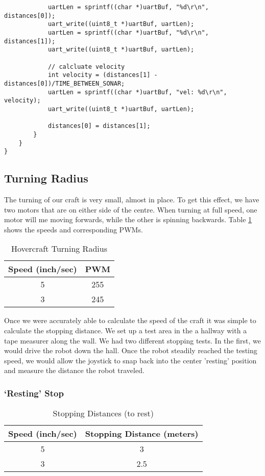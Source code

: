 \begin{lstlisting}
            uartLen = sprintf((char *)uartBuf, "%d\r\n", distances[0]);
            uart_write((uint8_t *)uartBuf, uartLen);
            uartLen = sprintf((char *)uartBuf, "%d\r\n", distances[1]);
            uart_write((uint8_t *)uartBuf, uartLen);

            // calcluate velocity
            int velocity = (distances[1] - distances[0])/TIME_BETWEEN_SONAR;
            uartLen = sprintf((char *)uartBuf, "vel: %d\r\n", velocity);
            uart_write((uint8_t *)uartBuf, uartLen);

            distances[0] = distances[1];
        }
    }
}
\end{lstlisting}

\subsection{Turning Radius}
The turning of our craft is very small, almost in place. To get this effect, we have two motors that are on either side of the centre. When turning at full speed, one motor will me moving forwards, while the other is spinning backwards. Table \ref{turningRadius} shows the speeds and corresponding PWMs. 

\begin{table}
\caption{Hovercraft Turning Radius}
\begin{center}
\begin{tabular}{ c c }
  Speed (inch/sec) & PWM \\
  \hline
  5 & 255 \\
  3 & 245 \\
\end{tabular}
\end{center}
\label{turningRadius}
\end{table}

Once we were accurately able to calculate the speed of the craft it was simple to calculate the stopping distance. We set up a test area in the a hallway with a tape measurer along the wall. We had two different stopping tests. In the first, we would drive the robot down the hall. Once the robot steadily reached the testing speed, we would allow the joystick to snap back into the center 'resting' position and measure the distance the robot traveled.

\subsubsection{`Resting' Stop}
\begin{table}
\caption{Stopping Distances (to rest)}
\begin{center}
\begin{tabular}{ c c }
  Speed (inch/sec) & Stopping Distance (meters) \\
  \hline
  5 & 3 \\
  3 & 2.5 \\
\end{tabular}
\end{center}
\label{restingTable}
\end{table}

